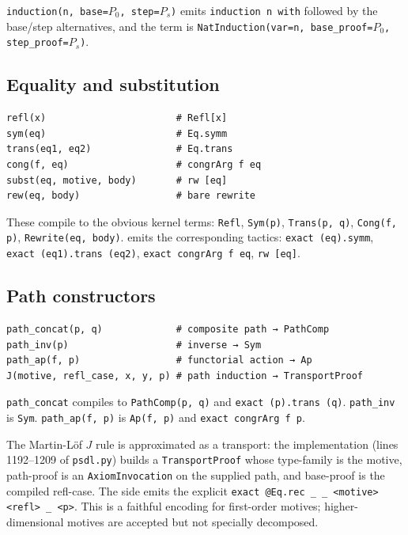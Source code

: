 \texttt{induction(n, base=$P_0$, step=$P_s$)} emits
\verb|induction n with| followed by the base/step alternatives, and
the term is \texttt{NatInduction(var=n, base\_proof=$P_0$,
step\_proof=$P_s$)}.

\subsection{Equality and substitution}

\begin{lstlisting}[language=psdl]
refl(x)                       # Refl[x]
sym(eq)                       # Eq.symm
trans(eq1, eq2)               # Eq.trans
cong(f, eq)                   # congrArg f eq
subst(eq, motive, body)       # rw [eq]
rew(eq, body)                 # bare rewrite
\end{lstlisting}

These compile to the obvious kernel terms:
\texttt{Refl}, \texttt{Sym(p)}, \texttt{Trans(p, q)}, \texttt{Cong(f,
p)}, \texttt{Rewrite(eq, body)}.  \Lean{} emits the corresponding
tactics: \verb|exact (eq).symm|, \verb|exact (eq1).trans (eq2)|,
\verb|exact congrArg f eq|, \verb|rw [eq]|.

\subsection{Path constructors}

\begin{lstlisting}[language=psdl]
path_concat(p, q)             # composite path → PathComp
path_inv(p)                   # inverse → Sym
path_ap(f, p)                 # functorial action → Ap
J(motive, refl_case, x, y, p) # path induction → TransportProof
\end{lstlisting}

\texttt{path\_concat} compiles to \texttt{PathComp(p, q)} and
\Lean{} \verb|exact (p).trans (q)|.  \texttt{path\_inv} is
\texttt{Sym}.  \texttt{path\_ap(f, p)} is \texttt{Ap(f, p)} and
\Lean{} \verb|exact congrArg f p|.

The Martin-L\"of $J$ rule is approximated as a transport: the
implementation (lines 1192--1209 of \texttt{psdl.py}) builds a
\texttt{TransportProof} whose type-family is the motive,
path-proof is an \texttt{AxiomInvocation} on the supplied path, and
base-proof is the compiled refl-case.  The \Lean{} side emits the
explicit \verb|exact @Eq.rec _ _ <motive> <refl> _ <p>|.  This is a
faithful encoding for first-order motives; higher-dimensional
motives are accepted but not specially decomposed.

